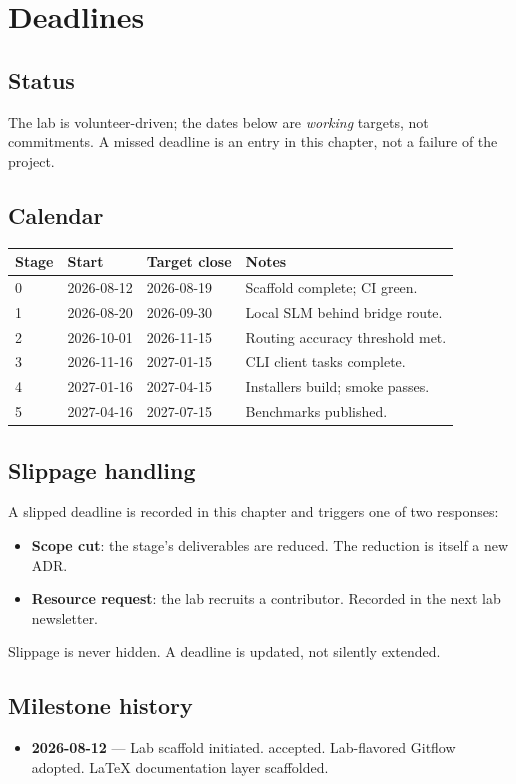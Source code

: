 
\chapter{Deadlines}

\section{Status}

The lab is volunteer-driven; the dates below are \emph{working}
targets, not commitments. A missed deadline is an entry in this
chapter, not a failure of the project.

\section{Calendar}

\begin{longtable}{p{3.0cm}p{3.0cm}p{3.0cm}p{4.4cm}}
\toprule
\textbf{Stage} & \textbf{Start} & \textbf{Target close} & \textbf{Notes} \\
\midrule
0 & 2026-08-12 & 2026-08-19 & Scaffold complete; CI green. \\
1 & 2026-08-20 & 2026-09-30 & Local SLM behind bridge route. \\
2 & 2026-10-01 & 2026-11-15 & Routing accuracy threshold met. \\
3 & 2026-11-16 & 2027-01-15 & CLI client tasks complete. \\
4 & 2027-01-16 & 2027-04-15 & Installers build; smoke passes. \\
5 & 2027-04-16 & 2027-07-15 & Benchmarks published. \\
\bottomrule
\end{longtable}

\section{Slippage handling}

A slipped deadline is recorded in this chapter and triggers one of
two responses:

\begin{itemize}
  \item \textbf{Scope cut}: the stage's deliverables are reduced.
        The reduction is itself a new ADR.
  \item \textbf{Resource request}: the lab recruits a contributor.
        Recorded in the next lab newsletter.
\end{itemize}

Slippage is never hidden. A deadline is updated, not silently
extended.

\section{Milestone history}

\begin{itemize}
  \item \textbf{2026-08-12} --- Lab scaffold initiated.
         accepted.
        Lab-flavored Gitflow adopted.
        LaTeX documentation layer scaffolded.
\end{itemize}
